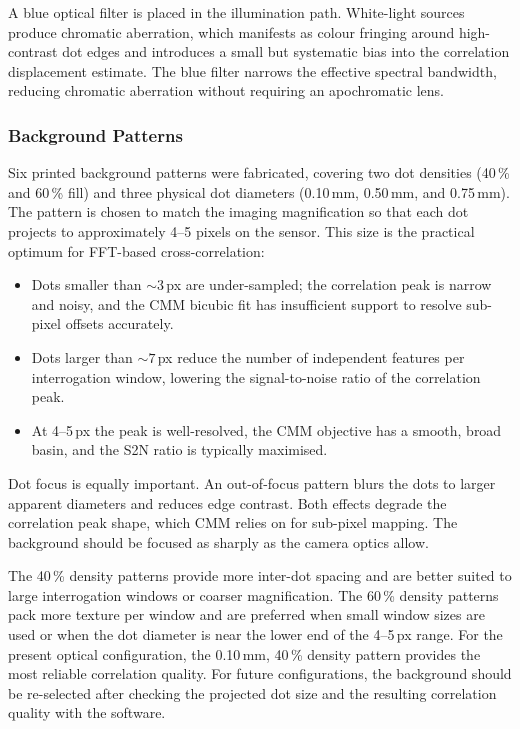\documentclass[11pt]{article}
\begin{document}
A blue optical filter is placed in the illumination path. White-light
sources produce chromatic aberration,
which manifests as colour fringing around high-contrast
dot edges and introduces a small but systematic bias into the correlation
displacement estimate. The blue filter narrows the effective spectral
bandwidth, reducing chromatic aberration without requiring an apochromatic
lens.

\subsubsection{Background Patterns}

Six printed background patterns were fabricated, covering two dot densities
(40\,\% and 60\,\% fill) and three physical dot diameters (0.10\,mm,
0.50\,mm, and 0.75\,mm). The pattern is chosen to match the imaging
magnification so that each dot projects to approximately 4--5 pixels on
the sensor. This size is the practical optimum for FFT-based cross-correlation:

\begin{itemize}[noitemsep]
  \item Dots smaller than $\sim3$\,px are under-sampled; the correlation
        peak is narrow and noisy, and the CMM bicubic fit has insufficient
        support to resolve sub-pixel offsets accurately.
  \item Dots larger than $\sim7$\,px reduce the number of independent
        features per interrogation window, lowering the signal-to-noise
        ratio of the correlation peak.
  \item At 4--5\,px the peak is well-resolved, the CMM objective has a
        smooth, broad basin, and the S2N ratio is typically maximised.
\end{itemize}

Dot focus is equally important. An out-of-focus pattern blurs the dots to
larger apparent diameters and reduces edge contrast. Both effects degrade
the correlation peak shape, which CMM relies on for sub-pixel mapping.
The background should be focused as sharply as the camera optics allow.

The 40\,\% density patterns provide more inter-dot spacing and are better
suited to large interrogation windows or coarser magnification. The 60\,\%
density patterns pack more texture per window and are preferred when small
window sizes are used or when the dot diameter is near the lower end of the
4--5\,px range. For the present optical configuration, the 0.10\,mm,
40\,\% density pattern provides the most reliable correlation quality. For
future configurations, the background should be re-selected after checking
the projected dot size and the resulting correlation quality with the
software.
\end{document}
